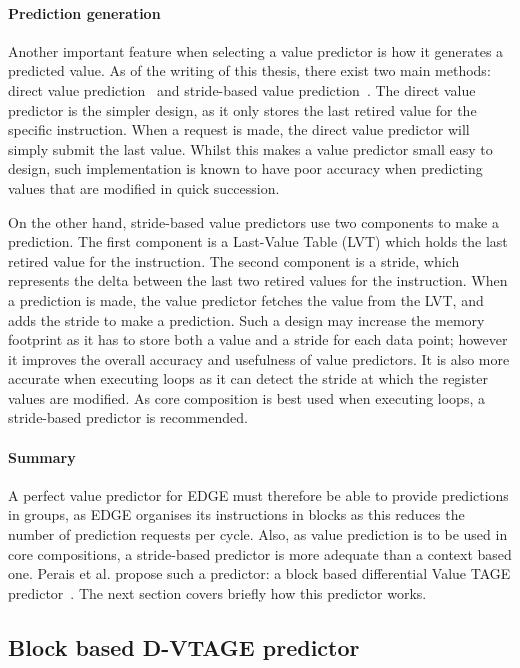\paragraph*{Prediction generation} Another important feature when selecting a value predictor is how it generates a predicted value.
As of the writing of this thesis, there exist two main methods: direct value prediction~\cite{peraisVTAGE2014} and stride-based value prediction~\cite{peraisBeBop2015,gabbayVPOrig,goeman01dfcm}.
The direct value predictor is the simpler design, as it only stores the last retired value for the specific instruction.
When a request is made, the direct value predictor will simply submit the last value.
Whilst this makes a value predictor small easy to design, such implementation is known to have poor accuracy when predicting values that are modified in quick succession.

On the other hand, stride-based value predictors use two components to make a prediction.
The first component is a Last-Value Table (LVT) which holds the last retired value for the instruction.
The second component is a stride, which represents the delta between the last two retired values for the instruction.
When a prediction is made, the value predictor fetches the value from the LVT, and adds the stride to make a prediction.
Such a design may increase the memory footprint as it has to store both a value and a stride for each data point; however it improves the overall accuracy and usefulness of value predictors.
It is also more accurate when executing loops as it can detect the stride at which the register values are modified.
As core composition is best used when executing loops, a stride-based predictor is recommended.

\paragraph*{Summary}

A perfect value predictor for EDGE must therefore be able to provide predictions in groups, as EDGE organises its instructions in blocks as this reduces the number of prediction requests per cycle.
Also, as value prediction is to be used in core compositions, a stride-based predictor is more adequate than a context based one.
Perais et al. propose such a predictor: a block based differential Value TAGE predictor~\cite{peraisBeBop2015}.
The next section covers briefly how this predictor works.

\subsection{Block based D-VTAGE predictor}

